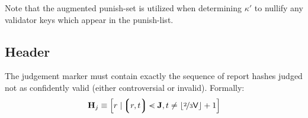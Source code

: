 Note that the augmented punish-set is utilized when determining $\kappa'$ to nullify any validator keys which appear in the punish-list.

\subsection{Header}\label{sec:judgementmarker}

The judgement marker must contain exactly the sequence of report hashes judged not as confidently valid (\ie either controversial or invalid). Formally:
\begin{equation}
  \mathbf{H}_j \equiv \sq{r \mid \tup{r, t} \orderedin \mathbf{J}, t \ne \floor{\nicefrac{2}{3}\mathsf{V}} + 1}
\end{equation}
